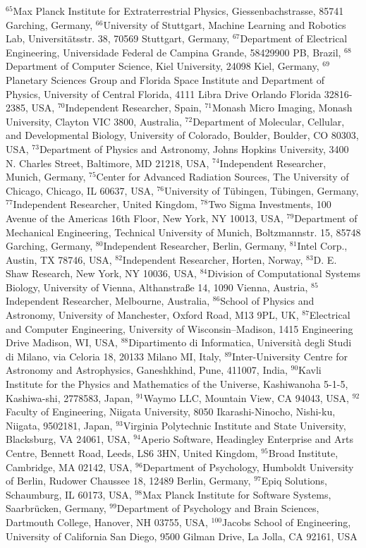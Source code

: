 $^{65}$Max Planck Institute for Extraterrestrial Physics, Giessenbachstrasse, 85741 Garching, Germany, 
$^{66}$University of Stuttgart, Machine Learning and Robotics Lab, Universitätsstr. 38, 70569 Stuttgart, Germany, 
$^{67}$Department of Electrical Engineering, Universidade Federal de Campina Grande, 58429900 PB, Brazil, 
$^{68}$Department of Computer Science, Kiel University, 24098 Kiel, Germany, 
$^{69}$Planetary Sciences Group and Florida Space Institute and Department of Physics, University of Central Florida, 4111 Libra Drive Orlando Florida 32816-2385, USA, 
$^{70}$Independent Researcher, Spain, 
$^{71}$Monash Micro Imaging, Monash University, Clayton VIC 3800, Australia, 
$^{72}$Department of Molecular, Cellular, and Developmental Biology, University of Colorado, Boulder, Boulder, CO 80303, USA, 
$^{73}$Department of Physics and Astronomy, Johns Hopkins University, 3400 N. Charles Street, Baltimore, MD 21218, USA, 
$^{74}$Independent Researcher, Munich, Germany, 
$^{75}$Center for Advanced Radiation Sources, The University of Chicago, Chicago, IL 60637, USA, 
$^{76}$University of T\"ubingen, T\"ubingen, Germany, 
$^{77}$Independent Researcher, United Kingdom, 
$^{78}$Two Sigma Investments, 100 Avenue of the Americas 16th Floor, New York, NY 10013, USA, 
$^{79}$Department of Mechanical Engineering, Technical University of Munich, Boltzmannstr. 15, 85748 Garching, Germany, 
$^{80}$Independent Researcher, Berlin, Germany, 
$^{81}$Intel Corp., Austin, TX 78746, USA, 
$^{82}$Independent Researcher, Horten, Norway, 
$^{83}$D. E. Shaw Research, New York, NY 10036, USA, 
$^{84}$Division of Computational Systems Biology, University of Vienna, Althanstra{\ss}e 14, 1090 Vienna, Austria, 
$^{85}$Independent Researcher, Melbourne, Australia, 
$^{86}$School of Physics and Astronomy, University of Manchester, Oxford Road, M13 9PL, UK, 
$^{87}$Electrical and Computer Engineering, University of Wisconsin--Madison, 1415 Engineering Drive Madison, WI, USA, 
$^{88}$Dipartimento di Informatica, Universit\`a degli Studi di Milano, via Celoria 18, 20133 Milano MI, Italy, 
$^{89}$Inter-University Centre for Astronomy and Astrophysics, Ganeshkhind, Pune, 411007, India, 
$^{90}$Kavli Institute for the Physics and Mathematics of the Universe, Kashiwanoha 5-1-5, Kashiwa-shi, 2778583, Japan, 
$^{91}$Waymo LLC, Mountain View, CA 94043, USA, 
$^{92}$Faculty of Engineering, Niigata University, 8050 Ikarashi-Ninocho, Nishi-ku, Niigata, 9502181, Japan, 
$^{93}$Virginia Polytechnic Institute and State University, Blacksburg, VA 24061, USA, 
$^{94}$Aperio Software, Headingley Enterprise and Arts Centre, Bennett Road, Leeds, LS6 3HN, United Kingdom, 
$^{95}$Broad Institute, Cambridge, MA 02142, USA, 
$^{96}$Department of Psychology, Humboldt University of Berlin, Rudower Chaussee 18, 12489 Berlin, Germany, 
$^{97}$Epiq Solutions, Schaumburg, IL 60173, USA, 
$^{98}$Max Planck Institute for Software Systems, Saarbr\"ucken, Germany, 
$^{99}$Department of Psychology and Brain Sciences, Dartmouth College, Hanover, NH 03755, USA, 
$^{100}$Jacobs School of Engineering, University of California San Diego, 9500 Gilman Drive, La Jolla, CA 92161, USA